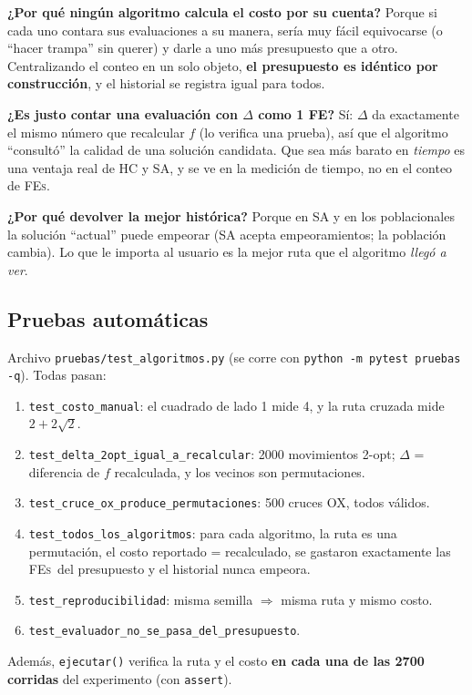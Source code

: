 \documentclass[11pt,a4paper]{article}
\newcommand{\FEs}{\textsc{FEs}}
\newcommand{\archivo}[1]{\texttt{#1}}
\begin{document}
\begin{porque}
\textbf{¿Por qué ningún algoritmo calcula el costo por su cuenta?} Porque si cada uno contara sus evaluaciones a su manera, sería muy fácil
equivocarse (o ``hacer trampa'' sin querer) y darle a uno más presupuesto que a otro. Centralizando el conteo en un solo objeto,
\textbf{el presupuesto es idéntico por construcción}, y el historial se registra igual para todos.

\textbf{¿Es justo contar una evaluación con $\Delta$ como 1 FE?} Sí: $\Delta$ da exactamente el mismo número que recalcular $f$ (lo verifica una prueba),
así que el algoritmo ``consultó'' la calidad de una solución candidata. Que sea más barato en \emph{tiempo} es una ventaja real de HC y SA,
y se ve en la medición de tiempo, no en el conteo de \FEs.

\textbf{¿Por qué devolver la mejor histórica?} Porque en SA y en los poblacionales la solución ``actual'' puede empeorar (SA acepta empeoramientos;
la población cambia). Lo que le importa al usuario es la mejor ruta que el algoritmo \emph{llegó a ver}.
\end{porque}

\subsection{Pruebas automáticas}
Archivo \archivo{pruebas/test\_algoritmos.py} (se corre con \texttt{python -m pytest pruebas -q}). Todas pasan:
\begin{enumerate}
\item \texttt{test\_costo\_manual}: el cuadrado de lado 1 mide 4, y la ruta cruzada mide $2+2\sqrt2$.
\item \texttt{test\_delta\_2opt\_igual\_a\_recalcular}: 2000 movimientos 2-opt; $\Delta$ = diferencia de $f$ recalculada, y los vecinos son permutaciones.
\item \texttt{test\_cruce\_ox\_produce\_permutaciones}: 500 cruces OX, todos válidos.
\item \texttt{test\_todos\_los\_algoritmos}: para cada algoritmo, la ruta es una permutación, el costo reportado = recalculado, se gastaron exactamente
      las \FEs\ del presupuesto y el historial nunca empeora.
\item \texttt{test\_reproducibilidad}: misma semilla $\Rightarrow$ misma ruta y mismo costo.
\item \texttt{test\_evaluador\_no\_se\_pasa\_del\_presupuesto}.
\end{enumerate}
Además, \texttt{ejecutar()} verifica la ruta y el costo \textbf{en cada una de las 2700 corridas} del experimento (con \texttt{assert}).
\end{document}
